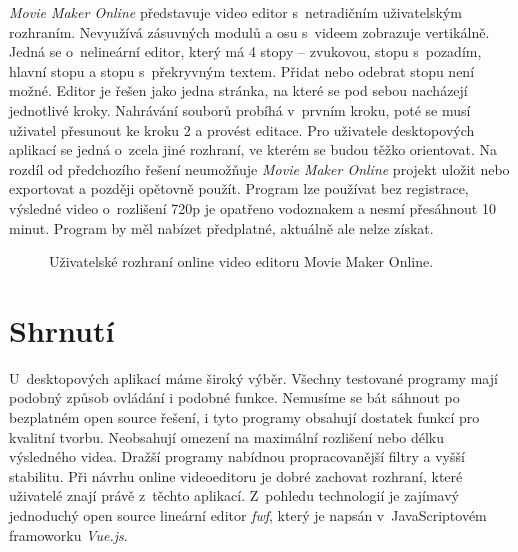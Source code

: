 \textit{Movie Maker Online} představuje video editor s~netradičním uživatelským rozhraním. Nevyužívá zásuvných modulů a osu s~videem zobrazuje vertikálně. Jedná se o~nelineární editor, který má 4 stopy -- zvukovou, stopu s~pozadím, hlavní stopu a stopu s~překryvným textem. Přidat nebo odebrat stopu není možné. Editor je řešen jako jedna stránka, na které se pod sebou nacházejí jednotlivé kroky. Nahrávání souborů probíhá v~prvním kroku, poté se musí uživatel přesunout ke kroku 2 a provést editace. Pro uživatele desktopových aplikací se jedná o~zcela jiné rozhraní, ve kterém se budou těžko orientovat. Na rozdíl od předchozího řešení neumožňuje \textit{Movie Maker Online} projekt uložit nebo exportovat a později opětovně použít. Program lze používat bez registrace, výsledné video o~rozlišení 720p je opatřeno vodoznakem a nesmí přesáhnout 10 minut. Program by měl nabízet předplatné, aktuálně ale nelze získat.
\begin{figure}[h]
	\centering
	\caption{Uživatelské rozhraní online video editoru Movie Maker Online.}\label{img:moviemakeronline}
\end{figure}

\section{Shrnutí}
U~desktopových aplikací máme široký výběr. Všechny testované programy mají podobný způsob ovládání i podobné funkce. Nemusíme se bát sáhnout po bezplatném open source řešení, i tyto programy obsahují dostatek funkcí pro kvalitní tvorbu. Neobsahují omezení na maximální rozlišení nebo délku výsledného videa. Dražší programy nabídnou propracovanější filtry a vyšší stabilitu. Při návrhu online videoeditoru je dobré zachovat rozhraní, které uživatelé znají právě z~těchto aplikací. Z~pohledu technologií je zajímavý jednoduchý open source lineární editor \textit{fwf}, který je napsán v~JavaScriptovém framoworku \textit{Vue.js}.

